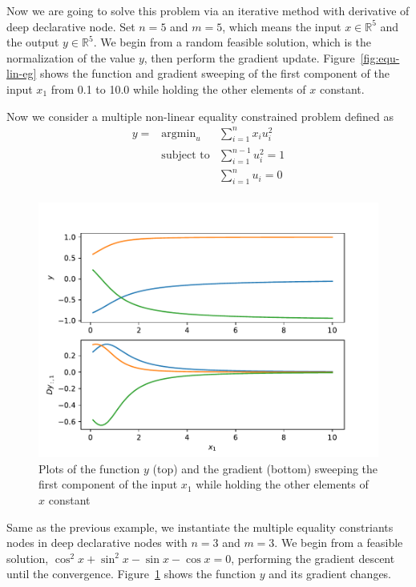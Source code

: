\par Now we are going to solve this problem via an iterative method with derivative of deep declarative node. Set $n=5$ and $m=5$, which means the input $x \in \mathbb{R}^5$ and the output $y \in \mathbb{R}^5$. We begin from a random feasible solution, which is the normalization of the value $y$, then perform the gradient update. Figure~\ref{fig:equ-lin-eg} shows the function and gradient sweeping of the first component of the input $x_1$ from 0.1 to 10.0 while holding the other elements of $x$ constant. 
\par Now we consider a multiple non-linear equality constrained problem defined as
\begin{equation}
    \begin{array}{rll}
        y =& \text{argmin}_u & \sum_{i=1}^{n} x_i u_i^{2} \\
        & \text{subject to} & \sum_{i=1}^{n-1} u_i^2 = 1 \\
        & & \sum_{i=1}^{n} u_i = 0 \\
    \end{array}
\end{equation}
\begin{figure}[t]
    \label{fig:equ-nonlin-eg}
    \centering
    \includegraphics[page=1,width=.8\textwidth]{figs/multiple_equality_example.pdf} 
    \caption{Plots of the function $y$ (top) and the gradient (bottom) sweeping the first component of the input $x_1$ while holding the other elements of $x$ constant}
\end{figure}
\par Same as the previous example, we instantiate the multiple equality constriants nodes in deep declarative nodes with $n=3$ and $m=3$. We begin from a feasible solution, $\cos^2 x + \sin^2 x - \sin x - \cos x = 0$, performing the gradient descent until the convergence. Figure~\ref{fig:equ-nonlin-eg} shows the function $y$ and its gradient changes. 

